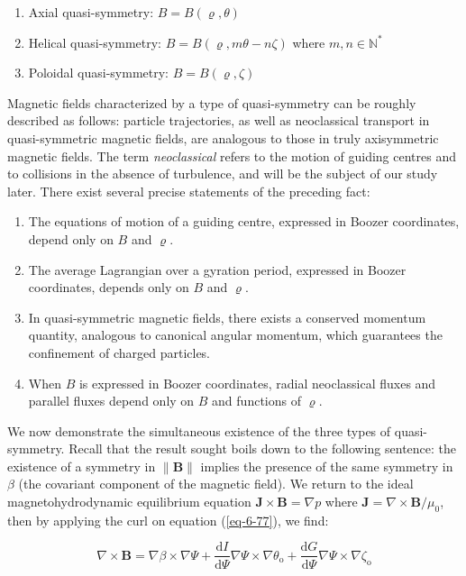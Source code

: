 \begin{enumerate}
    \item Axial quasi-symmetry: $B=B(\varrho, \theta)$
    \item Helical quasi-symmetry: $B=B(\varrho, m\theta-n\zeta)$ where $m,n\in\mathbb{N}^*$
    \item Poloidal quasi-symmetry: $B=B(\varrho, \zeta)$
\end{enumerate}

Magnetic fields characterized by a type of quasi-symmetry can be roughly described as follows: particle trajectories, as well as neoclassical transport in quasi-symmetric magnetic fields, are analogous to those in truly axisymmetric magnetic fields. The term \textit{neoclassical} refers to the motion of guiding centres and to collisions in the absence of turbulence, and will be the subject of our study later. There exist several precise statements of the preceding fact:

\begin{enumerate}
    \item The equations of motion of a guiding centre, expressed in Boozer coordinates, depend only on $B$ and $\varrho$.
    \item The average Lagrangian over a gyration period, expressed in Boozer coordinates, depends only on $B$ and $\varrho$.
    \item In quasi-symmetric magnetic fields, there exists a conserved momentum quantity, analogous to canonical angular momentum, which guarantees the confinement of charged particles.
    \item When $B$ is expressed in Boozer coordinates, radial neoclassical fluxes and parallel fluxes depend only on $B$ and functions of $\varrho$.
\end{enumerate}

We now demonstrate the simultaneous existence of the three types of quasi-symmetry. Recall that the result sought boils down to the following sentence: the existence of a symmetry in $\|\mathbf{B}\|$ implies the presence of the same symmetry in $\beta$ (the covariant component of the magnetic field). We return to the ideal magnetohydrodynamic equilibrium equation $\mathbf{J}\times\mathbf{B}=\nabla p$ where $\mathbf{J}=\nabla\times\mathbf{B}/\mu_0$, then by applying the curl on equation (\ref{eq-6-77}), we find:

\begin{equation}
    \nabla\times\mathbf{B}=\nabla\beta\times\nabla\Psi+\frac{\mathrm{d}I}{\mathrm{d}\Psi}\nabla\Psi\times\nabla\theta_\text{o}+\frac{\mathrm{d}G}{\mathrm{d}\Psi}\nabla\Psi\times\nabla\zeta_\text{o}
\end{equation}

